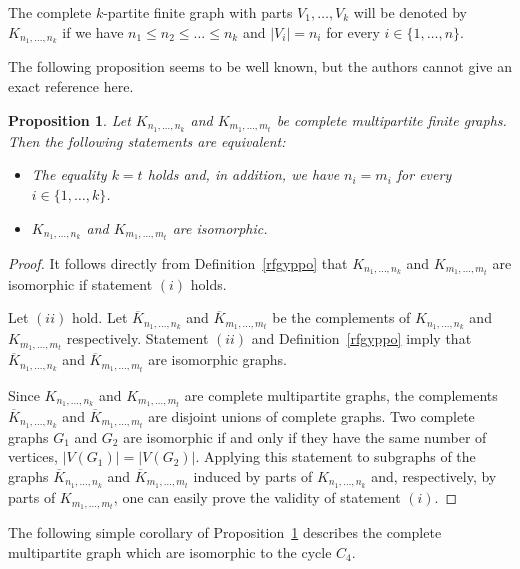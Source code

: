 \documentclass[11pt]{article}
\newtheorem{proposition}[theorem]{Proposition}
\theoremstyle{definition}
\theoremstyle{remark}
\numberwithin{equation}{section}
\begin{document}
The complete $k$-partite finite graph with parts $V_1, \ldots, V_k$  will be denoted by
$K_{n_1, \ldots, n_k}$ if we have $n_1 \leq n_2 \leq \ldots \leq n_k$ 
and 
$|V_i| = n_i$ 
for every $i \in \{1,\ldots,n\}$.

The following proposition seems to be well known, but the authors cannot give an exact reference here.

\begin{proposition}\label{zbgqee}
Let $K_{n_1,\ldots,n_k}$ and $K_{m_1,\ldots,m_t}$ be complete
multipartite finite graphs. Then the following statements 
are equivalent:
\begin{itemize}[left=10pt]
    \item[(i)] The equality $k=t$ holds and, in addition, we have 
    $n_i = m_i$ for every $i \in \{1,\ldots,k\}$.
        \item[(ii)] $K_{n_1,\ldots,n_k}$ and $K_{m_1,\ldots,m_t}$ are isomorphic.
\end{itemize}
\end{proposition}


\begin{proof}
It follows directly from Definition~\ref{rfgyppo} that
$K_{n_1,\ldots,n_k}$ and $K_{m_1,\ldots,m_t}$ are isomorphic if statement $(i)$ holds. 

Let $(ii)$ hold. Let $\overline{K}_{n_1,\ldots,n_k}$ and $\overline{K}_{m_1,\ldots,m_t}$ be the complements of $K_{n_1,\ldots,n_k}$ and $K_{m_1,\ldots,m_t}$ respectively. Statement $(ii)$ and Definition~\ref{rfgyppo} imply that $\overline{K}_{n_1,\ldots,n_k}$ and $\overline{K}_{m_1,\ldots,m_t}$ are isomorphic graphs.


Since $K_{n_1,\ldots,n_k}$ and $K_{m_1,\ldots,m_t}$ are complete multipartite graphs, the complements $\overline{K}_{n_1,\ldots,n_k}$ and $\overline{K}_{m_1,\ldots,m_t}$ are disjoint unions
of complete graphs. 
Two complete graphs $G_1$ and $G_2$ are isomorphic if and only if
they have the same number of vertices, $|V(G_1)| = |V(G_2)|$.
Applying this statement to subgraphs of the graphs $\overline{K}_{n_1,\ldots,n_k}$ and
$\overline{K}_{m_1,\ldots,m_t}$ induced by parts of $K_{n_1,\ldots,n_k}$ and, respectively, by parts of $K_{m_1,\ldots,m_t}$, one can easily prove the validity
of statement $(i)$. 
\end{proof}

The following simple corollary of Proposition~\ref{zbgqee} describes the complete multipartite graph which are isomorphic to the cycle $C_4$.
\end{document}
